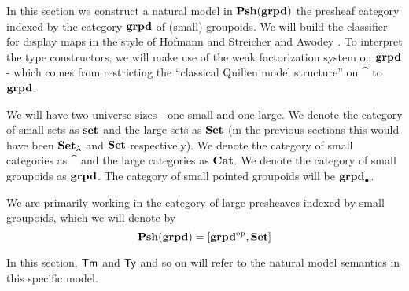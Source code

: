 
In this section we construct a natural model in $\mathbf{Psh}(\mathbf{grpd})$ the presheaf category
indexed by the category $\mathbf{grpd}$ of (small) groupoids.
We will build the classifier for display maps in the style of
Hofmann and Streicher \cite{hofmannstreicher1996} and Awodey \cite{awodey2023hofmannstreicheruniverses}.
To interpret the type constructors,
we will make use of the weak factorization system on $\mathbf{grpd}$ -
which comes from restricting the ``classical Quillen model structure'' on
$\cat$ \cite{joyalnlabmodelstructuresoncat} to $\mathbf{grpd}$.

\medskip

\begin{notation*}
  We will have two universe sizes - one small and one large.
  We denote the category of small sets as $\mathbf{set}$ and the large sets as $\mathbf{Set}$
  (in the previous sections this would have been $\mathbf{Set}_{\lambda}$ and $\mathbf{Set}$ respectively).
  We denote the category of small categories as $\cat$ and the large categories as $\mathbf{Cat}$.
  We denote the category of small groupoids as $\mathbf{grpd}$. %
  The category of small pointed groupoids will be $\mathbf{grpd}_{\bullet}$.

  We are primarily working in the category of large presheaves indexed by small groupoids,
  which we will denote by
  \[ \mathbf{Psh}(\mathbf{grpd}) = [\mathbf{grpd}^{\mathrm{op}}, \mathbf{Set}]\]

  In this section, $\mathsf{Tm}$ and $\mathsf{Ty}$ and so on will refer to the natural model semantics in this
  specific model.
\end{notation*}

\medskip

